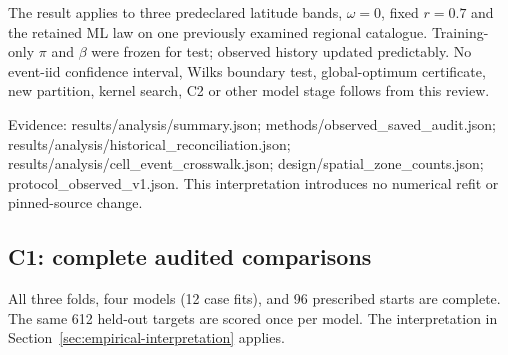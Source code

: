 The result applies to three predeclared latitude bands, $\omega=0$, fixed $r=0.7$ and the retained ML law on one previously examined regional catalogue. Training-only $\pi$ and $\beta$ were frozen for test; observed history updated predictably. No event-iid confidence interval, Wilks boundary test, global-optimum certificate, new partition, kernel search, C2 or other model stage follows from this review.

Evidence: results/\allowbreak{}\allowbreak{}analysis/summary.json; methods/\allowbreak{}\allowbreak{}observed\_\allowbreak{}saved\_\allowbreak{}audit.json; results/\allowbreak{}\allowbreak{}analysis/historical\_\allowbreak{}reconciliation.json; results/\allowbreak{}\allowbreak{}analysis/cell\_\allowbreak{}event\_\allowbreak{}crosswalk.json; design/spatial\_\allowbreak{}zone\_\allowbreak{}counts.json; protocol\_\allowbreak{}observed\_\allowbreak{}v1.json. This interpretation introduces no numerical refit or pinned-source change.

\subsection{C1: complete audited comparisons}

All three folds, four models (12 case fits), and 96 prescribed starts are complete. The same 612 held-out targets are scored once per model. The interpretation in Section~\ref{sec:empirical-interpretation} applies.

